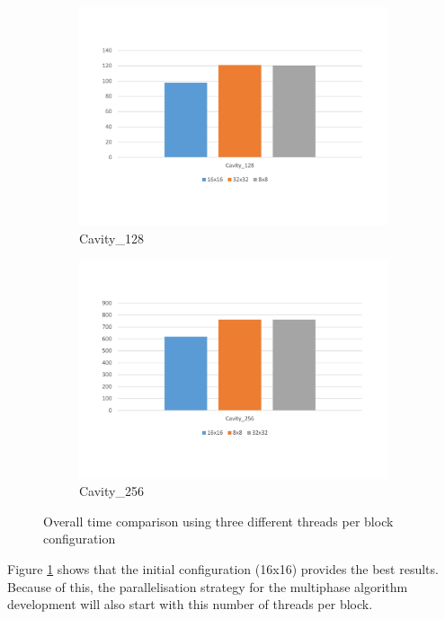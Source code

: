 \documentclass[12pt, openany]{book}
\begin{document}
\begin{figure}[H]
	\centering
	\begin{subfigure}{.49\textwidth}
		\includegraphics[width=\linewidth]{Resources/Images/timesThreads128.pdf}
		\caption{Cavity\_128}
	\end{subfigure}
	\begin{subfigure}{.49\textwidth}
		\includegraphics[width=\linewidth]{Resources/Images/timesThreads256.pdf}
		\caption{Cavity\_256}
	\end{subfigure} 
	\caption{Overall time comparison using three different threads per block configuration}
	\label{fig:timesThreads}
\end{figure} 

Figure \ref{fig:timesThreads} shows that the initial configuration (16x16) provides the best results. Because of this, the parallelisation strategy for the multiphase algorithm development will also start with this number of threads per block.
\end{document}
